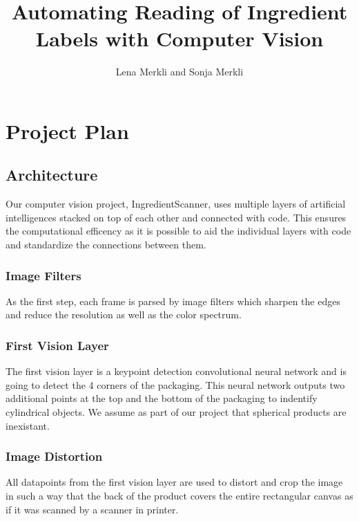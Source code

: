 \documentclass[a4paper,11pt]{report}
\title{Automating Reading of Ingredient Labels with Computer Vision}
\author{Lena Merkli and Sonja Merkli}
\begin{document}
    \maketitle
    \tableofcontents

    \chapter{Project Plan}

        \section{Architecture}
                Our computer vision project, IngredientScanner, uses multiple layers of artificial intelligences stacked on top of each other and connected with code. This ensures the computational efficency as it is possible to aid the individual layers with code and standardize the connections between them.

            \subsection{Image Filters}
                \label{subsec:architecture:filters}
                As the first step, each frame is parsed by image filters which sharpen the edges and reduce the resolution as well as the color spectrum.

            \subsection{First Vision Layer}
                The first vision layer is a keypoint detection convolutional neural network and is going to detect the 4 corners of the packaging. This neural network outputs two additional points at the top and the bottom of the packaging to indentify cylindrical objects. We assume as part of our project that spherical products are inexistant.

            \subsection{Image Distortion}
                \label{subsec:architecture:distortion}
                All datapoints from the first vision layer are used to distort and crop the image in such a way that the back of the product covers the entire rectangular canvas as if it was scanned by a scanner in printer.
\end{document}
